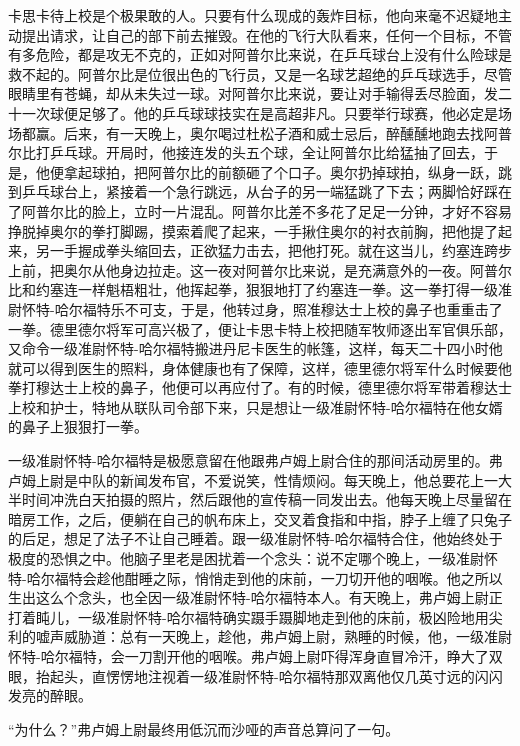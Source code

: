     卡思卡待上校是个极果敢的人。只要有什么现成的轰炸目标，他向来毫不迟疑地主动提出请求，让自己的部下前去摧毁。在他的飞行大队看来，任何一个目标，不管有多危险，都是攻无不克的，正如对阿普尔比来说，在乒乓球台上没有什么险球是救不起的。阿普尔比是位很出色的飞行员，又是一名球艺超绝的乒乓球选手，尽管眼睛里有苍蝇，却从未失过一球。对阿普尔比来说，要让对手输得丢尽脸面，发二十一次球便足够了。他的乒乓球球技实在是高超非凡。只要举行球赛，他必定是场场都赢。后来，有一天晚上，奥尔喝过杜松子酒和威士忌后，醉醺醺地跑去找阿普尔比打乒乓球。开局时，他接连发的头五个球，全让阿普尔比给猛抽了回去，于是，他便拿起球拍，把阿普尔比的前额砸了个口子。奥尔扔掉球拍，纵身一跃，跳到乒乓球台上，紧接着一个急行跳远，从台子的另一端猛跳了下去；两脚恰好踩在了阿普尔比的脸上，立时一片混乱。阿普尔比差不多花了足足一分钟，才好不容易挣脱掉奥尔的拳打脚踢，摸索着爬了起来，一手揪住奥尔的衬衣前胸，把他提了起来，另一手握成拳头缩回去，正欲猛力击去，把他打死。就在这当儿，约塞连跨步上前，把奥尔从他身边拉走。这一夜对阿普尔比来说，是充满意外的一夜。阿普尔比和约塞连一样魁梧粗壮，他挥起拳，狠狠地打了约塞连一拳。这一拳打得一级准尉怀特-哈尔福特乐不可支，于是，他转过身，照准穆达士上校的鼻子也重重击了一拳。德里德尔将军可高兴极了，便让卡思卡特上校把随军牧师逐出军官俱乐部，又命令一级准尉怀特-哈尔福特搬进丹尼卡医生的帐篷，这样，每天二十四小时他就可以得到医生的照料，身体健康也有了保障，这样，德里德尔将军什么时候要他拳打穆达士上校的鼻子，他便可以再应付了。有的时候，德里德尔将军带着穆达士上校和护士，特地从联队司令部下来，只是想让一级准尉怀特-哈尔福特在他女婿的鼻子上狠狠打一拳。
 


    一级准尉怀特-哈尔福特是极愿意留在他跟弗卢姆上尉合住的那间活动房里的。弗卢姆上尉是中队的新闻发布官，不爱说笑，性情烦闷。每天晚上，他总要花上一大半时间冲洗白天拍摄的照片，然后跟他的宣传稿一同发出去。他每天晚上尽量留在暗房工作，之后，便躺在自己的帆布床上，交叉着食指和中指，脖子上缠了只兔子的后足，想足了法子不让自己睡着。跟一级准尉怀特-哈尔福特合住，他始终处于极度的恐惧之中。他脑子里老是困扰着一个念头：说不定哪个晚上，一级准尉怀特-哈尔福特会趁他酣睡之际，悄悄走到他的床前，一刀切开他的咽喉。他之所以生出这么个念头，也全因一级准尉怀特-哈尔福特本人。有天晚上，弗卢姆上尉正打着盹儿，一级准尉怀特-哈尔福特确实蹑手蹑脚地走到他的床前，极凶险地用尖利的嘘声威胁道：总有一天晚上，趁他，弗卢姆上尉，熟睡的时候，他，一级准尉怀特-哈尔福特，会一刀割开他的咽喉。弗卢姆上尉吓得浑身直冒冷汗，睁大了双眼，抬起头，直愣愣地注视着一级准尉怀特-哈尔福特那双离他仅几英寸远的闪闪发亮的醉眼。

    “为什么？”弗卢姆上尉最终用低沉而沙哑的声音总算问了一句。

